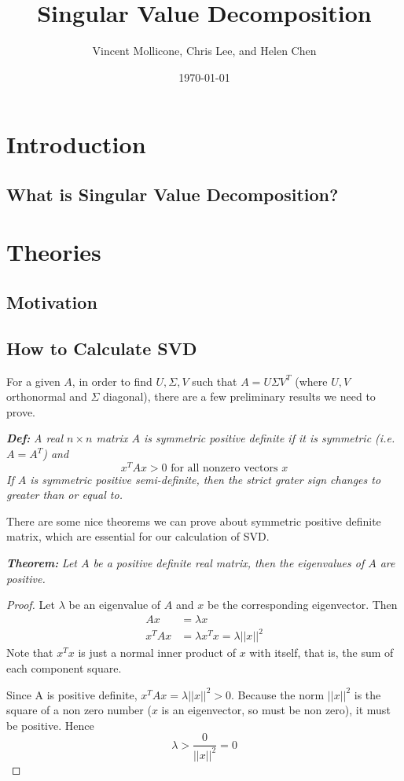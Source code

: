 \documentclass{article}
\title{Singular Value Decomposition}
\author{Vincent Mollicone, Chris Lee, and Helen Chen}
\date{\today}
\begin{document}
\maketitle

\section{Introduction}
\subsection{What is Singular Value Decomposition?}


\section{Theories}
\subsection{Motivation}

\subsection{How to Calculate SVD}
For a given $A$, in order to find $U, \Sigma, V$ such that $A = U \Sigma V^T$ (where $U,V$ orthonormal and $\Sigma$ diagonal), there are a few preliminary results we need to prove.
\bigskip

\textit{\textbf{Def:}} \textit{A real $n \times n$ matrix $A$ is symmetric positive definite if it is symmetric (i.e. $A=A^T$) and 
$$ x^T A x > 0 \text{ for all nonzero vectors }x$$
If $A$ is symmetric positive semi-definite, then the strict grater sign changes to greater than or equal to.}
\bigskip

There are some nice theorems we can prove about symmetric positive definite matrix, which are essential for our calculation of SVD.
\bigskip

\textit{\textbf{Theorem:}} \textit{Let $A$ be a positive definite real matrix, then the eigenvalues of $A$ are positive.}

\begin{proof}
Let $\lambda$ be an eigenvalue of $A$ and $x$ be the corresponding eigenvector. Then 
\begin{align*}
Ax &=\lambda x \\
x^T A x &= \lambda x^Tx  = \lambda || x ||^2 
\end{align*}
Note that $x^T x$ is just a normal inner product of $x$ with itself, that is, the sum of each component square.
  
Since A is positive definite, $x^T A x =\lambda ||x||^2> 0$. Because the norm $||x||^2 $ is the square of a non zero number ($x$ is an eigenvector, so must be non zero), it must be positive. Hence $$\lambda > \frac{0}{||x||^2} = 0$$
\end{proof}
\end{document}
